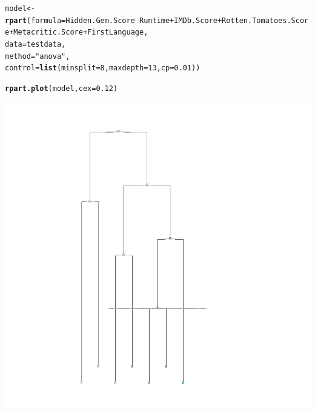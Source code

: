 \documentclass{article}\usepackage[]{graphicx}\usepackage[]{color}
\makeatletter
\newcommand{\hlnum}[1]{\textcolor[rgb]{0.686,0.059,0.569}{#1}}%
\newcommand{\hlstr}[1]{\textcolor[rgb]{0.192,0.494,0.8}{#1}}%
\newcommand{\hlopt}[1]{\textcolor[rgb]{0,0,0}{#1}}%
\newcommand{\hlstd}[1]{\textcolor[rgb]{0.345,0.345,0.345}{#1}}%
\newcommand{\hlkwb}[1]{\textcolor[rgb]{0.69,0.353,0.396}{#1}}%
\newcommand{\hlkwc}[1]{\textcolor[rgb]{0.333,0.667,0.333}{#1}}%
\newcommand{\hlkwd}[1]{\textcolor[rgb]{0.737,0.353,0.396}{\textbf{#1}}}%
\newenvironment{kframe}{%
 \def\at@end@of@kframe{}%
 \ifinner\ifhmode%
  \def\at@end@of@kframe{\end{minipage}}%
  \begin{minipage}{\columnwidth}%
 \fi\fi%
 \def\FrameCommand##1{\hskip\@totalleftmargin \hskip-\fboxsep
 \colorbox{shadecolor}{##1}\hskip-\fboxsep
     \hskip-\linewidth \hskip-\@totalleftmargin \hskip\columnwidth}%
 \MakeFramed {\advance\hsize-\width
   \@totalleftmargin\z@ \linewidth\hsize
   \@setminipage}}%
 {\par\unskip\endMakeFramed%
 \at@end@of@kframe}
\newenvironment{knitrout}{}{} %
\makeatother
\begin{document}
\begin{knitrout}
\begin{kframe}
\begin{alltt}
\hlstd{model} \hlkwb{<-} \hlkwd{rpart}\hlstd{(}\hlkwc{formula} \hlstd{= Hidden.Gem.Score} \hlopt{~} \hlstd{Runtime} \hlopt{+} \hlstd{IMDb.Score} \hlopt{+} \hlstd{Rotten.Tomatoes.Score} \hlopt{+} \hlstd{Metacritic.Score} \hlopt{+} \hlstd{FirstLanguage,}
               \hlkwc{data} \hlstd{= testdata,}
               \hlkwc{method} \hlstd{=} \hlstr{"anova"}\hlstd{,}
               \hlkwc{control} \hlstd{=} \hlkwd{list}\hlstd{(}\hlkwc{minsplit} \hlstd{=} \hlnum{8}\hlstd{,} \hlkwc{maxdepth} \hlstd{=} \hlnum{13}\hlstd{,} \hlkwc{cp} \hlstd{=} \hlnum{0.01}\hlstd{))}

\hlkwd{rpart.plot}\hlstd{(model,} \hlkwc{cex} \hlstd{=} \hlnum{0.12}\hlstd{)}
\end{alltt}
\end{kframe}

{\centering \includegraphics[width=.6\linewidth]{figure/Task2-Rnwauto-report-1} 

}



\end{knitrout}
\end{document}
